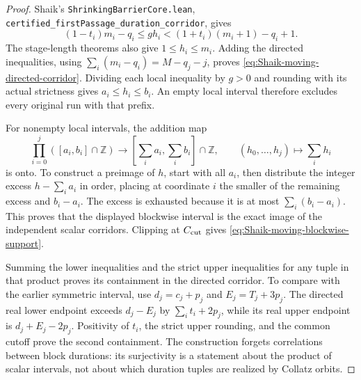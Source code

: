 \begin{proof}
Shaik's \texttt{ShrinkingBarrierCore.lean},
\texttt{certified\_firstPassage\_duration\_corridor}, gives
\[
 (1-t_i)m_i-q_i\le gh_i<
 (1+t_i)(m_i+1)-q_i+1.
\]
The stage-length theorems also give \(1\le h_i\le m_i\).
Adding the directed inequalities, using
\(\sum_i(m_i-q_i)=M-q_j-j\), proves
\eqref{eq:Shaik-moving-directed-corridor}. Dividing each local
inequality by \(g>0\) and rounding with its actual strictness gives
\(a_i\le h_i\le b_i\). An empty local interval therefore excludes
every original run with that prefix.

For nonempty local intervals, the addition map
\[
 \prod_{i=0}^j([a_i,b_i]\cap\mathbb Z)
       \longrightarrow [\textstyle\sum_i a_i,\sum_i b_i]\cap\mathbb Z,
 \qquad (h_0,\ldots,h_j)\longmapsto\sum_i h_i
\]
is onto. To construct a preimage of \(h\), start with all \(a_i\),
then distribute the integer excess \(h-\sum_i a_i\) in order,
placing at coordinate \(i\) the smaller of the remaining excess
and \(b_i-a_i\). The excess is exhausted because it is at most
\(\sum_i(b_i-a_i)\). This proves that the displayed blockwise
interval is the exact image of the independent scalar corridors.
Clipping at \(C_{\rm cut}\) gives
\eqref{eq:Shaik-moving-blockwise-support}.

Summing the lower inequalities and the strict upper inequalities for
any tuple in that product proves its containment in the directed
corridor. To compare with the earlier symmetric interval, use
\(d_j=c_j+p_j\) and \(E_j=T_j+3p_j\). The directed real lower
endpoint exceeds \(d_j-E_j\) by
\(\sum_i t_i+2p_j\), while its real upper endpoint is
\(d_j+E_j-2p_j\). Positivity of \(t_i\), the strict upper rounding,
and the common cutoff prove the second containment.
The construction forgets correlations between block durations:
its surjectivity is a statement about the product of scalar intervals,
not about which duration tuples are realized by Collatz orbits.
\end{proof}

